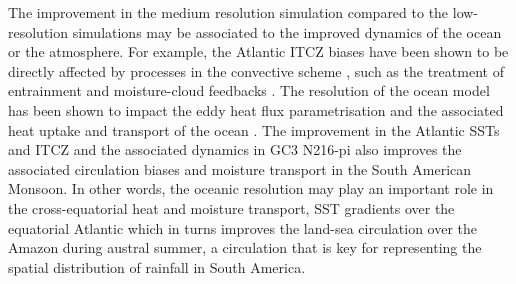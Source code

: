 The improvement in the medium resolution simulation compared to the low-resolution simulations may  be associated to the improved dynamics of the ocean or the atmosphere. %
For example, the Atlantic ITCZ biases have been shown to be directly affected by processes in the convective scheme \citep{bellucci2010}, such as the treatment of entrainment and moisture-cloud feedbacks \citep{oueslati2013,li2014}. 
The resolution of the ocean model has been shown to impact the eddy heat flux parametrisation and the associated heat uptake and transport of the ocean  \citep{kuhlbrodt2018}. The improvement in the Atlantic SSTs and ITCZ and the associated dynamics in GC3 N216-pi also improves the associated circulation biases and moisture transport in the South American Monsoon. In other words, the oceanic resolution may play an important role in the cross-equatorial heat and moisture transport, SST gradients over the equatorial Atlantic which in turns improves the land-sea circulation over the Amazon during austral summer, a circulation that is key for representing the spatial distribution of rainfall in South America.



